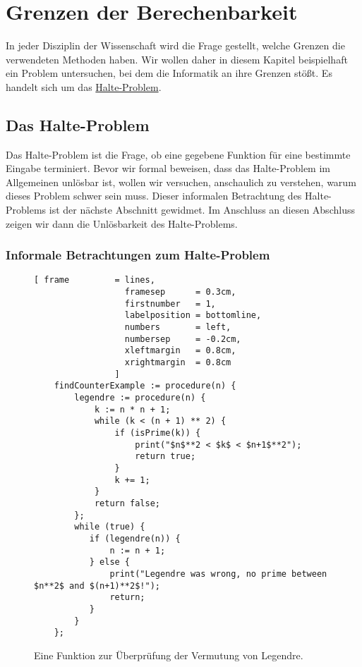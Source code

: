 \chapter{Grenzen der Berechenbarkeit}
In jeder Disziplin der Wissenschaft wird die Frage gestellt, welche Grenzen die
verwendeten Methoden haben.   Wir wollen daher in diesem Kapitel beispielhaft ein Problem
untersuchen, bei dem die Informatik an ihre Grenzen st\"{o}\ss{}t.  Es handelt sich um das
\href{http://de.wikipedia.org/wiki/Halteproblem}{Halte-Problem}.  

\section{Das Halte-Problem}
Das Halte-Problem ist die Frage, ob eine gegebene Funktion f\"{u}r eine bestimmte Eingabe 
terminiert.  Bevor wir formal beweisen, dass das Halte-Problem im Allgemeinen unl\"{o}sbar ist, wollen 
wir versuchen, anschaulich zu verstehen, warum dieses Problem schwer sein muss.  Dieser informalen
Betrachtung des Halte-Problems ist der n\"{a}chste Abschnitt gewidmet.  Im Anschluss an diesen Abschluss
zeigen wir dann die Unl\"{o}sbarkeit des Halte-Problems. 

\subsection{Informale Betrachtungen zum Halte-Problem}


\begin{figure}[!ht]
\centering
\begin{Verbatim}[ frame         = lines, 
                  framesep      = 0.3cm, 
                  firstnumber   = 1,
                  labelposition = bottomline,
                  numbers       = left,
                  numbersep     = -0.2cm,
                  xleftmargin   = 0.8cm,
                  xrightmargin  = 0.8cm
                ]
    findCounterExample := procedure(n) {
        legendre := procedure(n) {
            k := n * n + 1;
            while (k < (n + 1) ** 2) {
                if (isPrime(k)) {
                    print("$n$**2 < $k$ < $n+1$**2");
                    return true;
                }
                k += 1;
            }
            return false;
        };
        while (true) {
           if (legendre(n)) {
               n := n + 1;
           } else {
               print("Legendre was wrong, no prime between $n**2$ and $(n+1)**2$!");
               return;
           }
        }
    };
\end{Verbatim} 
\vspace*{-0.3cm}
\caption{Eine Funktion zur \"{U}berpr\"{u}fung der Vermutung von Legendre.}
\label{fig:legendre.stlx}
\end{figure}

